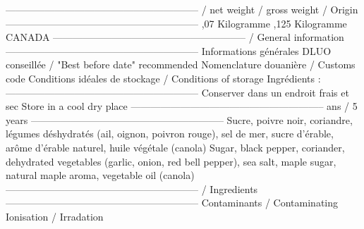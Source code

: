 \newline ----------------------------------------------------------- \newline / net weight \newline / gross weight \newline / Origin \newline ----------------------------------------------------------- ,07 Kilogramme ,125 Kilogramme \newline CANADA \newline ----------------------------------------------------------- \newline / General information \newline ----------------------------------------------------------- \newline Informations générales \newline DLUO conseillée / "Best before date" recommended \newline Nomenclature douanière / Customs code \newline Conditions idéales de stockage  \newline / Conditions of storage \newline Ingrédients :  \newline ----------------------------------------------------------- \newline Conserver dans un endroit frais et sec \newline Store in a cool dry place \newline -----------------------------------------------------------  ans / 5 years  \newline ----------------------------------------------------------- \newline Sucre, poivre noir, coriandre, légumes déshydratés (ail, oignon, \newline poivron rouge), sel de mer, sucre d'érable, arôme d'érable naturel, \newline huile végétale (canola) \newline Sugar, black pepper, coriander, dehydrated vegetables (garlic, onion, \newline red bell pepper), sea salt, maple sugar, natural maple aroma, \newline vegetable oil (canola) \newline ----------------------------------------------------------- \newline / Ingredients \newline ----------------------------------------------------------- \newline Contaminants / Contaminating \newline Ionisation /  Irradation \newline 